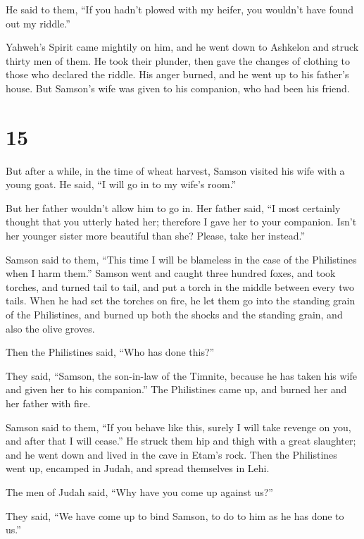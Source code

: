 He said to them, ``If you hadn't plowed with my heifer, you wouldn't
have found out my riddle.''

 Yahweh's Spirit came mightily on him, and he went down to
Ashkelon and struck thirty men of them. He took their plunder, then gave
the changes of clothing to those who declared the riddle. His anger
burned, and he went up to his father's house.  But Samson's
wife was given to his companion, who had been his friend.

\hypertarget{section-14}{%
\section{15}\label{section-14}}

 But after a while, in the time of wheat harvest, Samson
visited his wife with a young goat. He said, ``I will go in to my wife's
room.''

But her father wouldn't allow him to go in.  Her father
said, ``I most certainly thought that you utterly hated her; therefore I
gave her to your companion. Isn't her younger sister more beautiful than
she? Please, take her instead.''

 Samson said to them, ``This time I will be blameless in the
case of the Philistines when I harm them.''  Samson went and
caught three hundred foxes, and took torches, and turned tail to tail,
and put a torch in the middle between every two tails.  When
he had set the torches on fire, he let them go into the standing grain
of the Philistines, and burned up both the shocks and the standing
grain, and also the olive groves.

 Then the Philistines said, ``Who has done this?''

They said, ``Samson, the son-in-law of the Timnite, because he has taken
his wife and given her to his companion.'' The Philistines came up, and
burned her and her father with fire.

 Samson said to them, ``If you behave like this, surely I
will take revenge on you, and after that I will cease.''  He
struck them hip and thigh with a great slaughter; and he went down and
lived in the cave in Etam's rock.  Then the Philistines went
up, encamped in Judah, and spread themselves in Lehi.

 The men of Judah said, ``Why have you come up against
us?''

They said, ``We have come up to bind Samson, to do to him as he has done
to us.''

